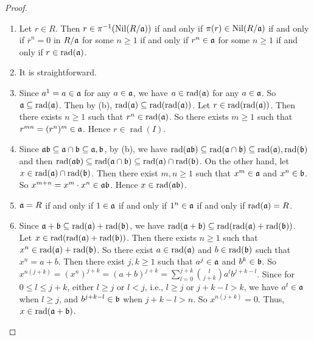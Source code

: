 \begin{proof}
    \begin{enumerate}
        \item Let $r \in R$. Then $r \in \pi^{-1}(\operatorname{Nil}(R/\mathfrak{a}))$ if and only if $\pi(r) \in \operatorname{Nil}(R/\mathfrak{a})$ if and only if $\overbar r^n = 0$ in $R/\mathfrak{a}$ for some $n \geq 1$ if and only if $r^n \in \mathfrak{a}$ for some $n \geq 1$ if and only if $r \in \operatorname{rad}(\mathfrak{a})$.
        \item It is straightforward.
        \item Since $a^1 = a \in \mathfrak{a}$ for any $a \in \mathfrak{a}$, we have $a \in \operatorname{rad}(\mathfrak{a})$ for any $a \in \mathfrak{a}$. So $\mathfrak{a} \subseteq \operatorname{rad}(\mathfrak{a})$. Then by (b), $\operatorname{rad}(\mathfrak{a}) \subseteq \operatorname{rad}(\operatorname{rad}(\mathfrak{a}))$. Let $r \in \operatorname{rad}(\operatorname{rad}(\mathfrak{a}))$. Then there exists $n \geq 1$ such that $r^n \in \operatorname{rad}(\mathfrak{a})$. So there exists $m \geq 1$ such that $r^{mn} = (r^n)^m \in \mathfrak{a}$. Hence $r \in \operatorname{rad}(I)$. 
        \item Since $\mathfrak{a}\mathfrak{b} \subseteq \mathfrak{a} \cap \mathfrak{b} \subseteq \mathfrak{a},\mathfrak{b}$, by (b), we have $\operatorname{rad}(\mathfrak{a}\mathfrak{b}) \subseteq \operatorname{rad}(\mathfrak{a} \cap \mathfrak{b}) \subseteq \operatorname{rad}(\mathfrak{a}),\operatorname{rad}(\mathfrak{b})$ and then $\operatorname{rad}(\mathfrak{a}\mathfrak{b}) \subseteq \operatorname{rad}(\mathfrak{a} \cap \mathfrak{b}) \subseteq \operatorname{rad}(\mathfrak{a}) \cap \operatorname{rad}(\mathfrak{b})$. On the other hand, let $x \in \operatorname{rad}(\mathfrak{a}) \cap \operatorname{rad}(\mathfrak{b})$. Then there exist $m,n \geq 1$ such that $x^m \in \mathfrak{a}$ and $x^n \in \mathfrak{b}$. So $x^{m+n} = x^m \cdot x^n \in \mathfrak{a} \mathfrak{b}$. Hence $x \in \operatorname{rad}(\mathfrak{a}\mathfrak{b})$.
        \item $\mathfrak{a} = R$ if and only if $1 \in \mathfrak{a}$ if and only if $1^n \in \mathfrak{a}$ if and only if $\operatorname{rad}(\mathfrak{a}) = R$. 
        \item Since $\mathfrak{a} + \mathfrak{b} \subseteq \operatorname{rad}(\mathfrak{a}) + \operatorname{rad}(\mathfrak{b})$, we have $\operatorname{rad}(\mathfrak{a} + \mathfrak{b}) \subseteq \operatorname{rad}(\operatorname{rad}(\mathfrak{a}) + \operatorname{rad}(\mathfrak{b}))$. \\
            Let $x \in \operatorname{rad}(\operatorname{rad}(\mathfrak{a}) + \operatorname{rad}(\mathfrak{b}))$. Then there exists $n \geq 1$ such that $x^n \in \operatorname{rad}(\mathfrak{a}) + \operatorname{rad}(\mathfrak{b})$. So there exist $a \in \operatorname{rad}(\mathfrak{a})$ and $b \in \operatorname{rad}(\mathfrak{b})$ such that $x^n = a + b$. Then there exist $j,k \geq 1$ such that $a^j \in \mathfrak{a}$ and $b^k \in \mathfrak{b}$. So $x^{n(j+k)} = (x^n)^{j+k} = (a+b)^{j+k} = \sum_{l = 0}^{j+k} \binom{l}{j+k} a^lb^{j+k-l}$. Since for $0 \leq l \leq j+k$, either $l \geq j$ or $l < j$, i.e., $l \geq j$ or $j+k-l > k$, we have $a^l \in \mathfrak{a}$ when $l \geq j$, and $b^{j+k-l} \in \mathfrak{b}$ when $j + k - l > n$. So $x^{n(j+k)} = 0$. Thus, $x\in \operatorname{rad}(\mathfrak{a}+\mathfrak{b})$.

\end{enumerate}
\end{proof}
